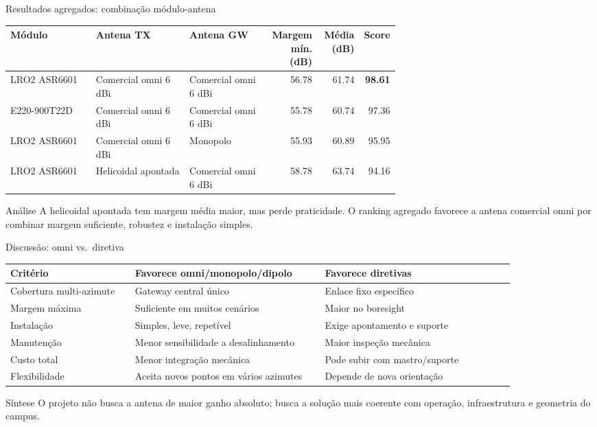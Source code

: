\documentclass[aspectratio=169]{beamer}
\begin{document}
\begin{frame}{Resultados agregados: combinação módulo-antena}
\small
\scriptsize
\begin{tabular}{p{0.22\linewidth}p{0.24\linewidth}p{0.20\linewidth}rrr}
\toprule
Módulo & Antena TX & Antena GW & Margem mín. (dB) & Média (dB) & Score \\
\midrule
LRO2 ASR6601  & Comercial omni 6 dBi  & Comercial omni 6 dBi & 56.78 & 61.74 & \textbf{98.61} \\
E220-900T22D  & Comercial omni 6 dBi  & Comercial omni 6 dBi & 55.78 & 60.74 & 97.36 \\
LRO2 ASR6601  & Comercial omni 6 dBi  & Monopolo             & 55.93 & 60.89 & 95.95 \\
LRO2 ASR6601  & Helicoidal apontada   & Comercial omni 6 dBi & 58.78 & 63.74 & 94.16 \\
\bottomrule
\end{tabular}
\vspace{0.5em}
\begin{block}{Análise}
A helicoidal apontada tem margem média maior, mas perde praticidade. O ranking agregado favorece a antena comercial omni por combinar margem suficiente, robustez e instalação simples.
\end{block}
\end{frame}
\begin{frame}{Discussão: omni vs.\ diretiva}
\small
\scriptsize
\begin{tabular}{p{0.23\linewidth}p{0.35\linewidth}p{0.35\linewidth}}
\toprule
Critério & Favorece omni/monopolo/dipolo & Favorece diretivas \\
\midrule
Cobertura multi-azimute & Gateway central único & Enlace fixo específico \\
Margem máxima & Suficiente em muitos cenários & Maior no boresight \\
Instalação & Simples, leve, repetível & Exige apontamento e suporte \\
Manutenção & Menor sensibilidade a desalinhamento & Maior inspeção mecânica \\
Custo total & Menor integração mecânica & Pode subir com mastro/suporte \\
Flexibilidade & Aceita novos pontos em vários azimutes & Depende de nova orientação \\
\bottomrule
\end{tabular}
\vspace{0.5em}
\begin{block}{Síntese}
\small O projeto não busca a antena de maior ganho absoluto; busca a solução mais coerente com operação, infraestrutura e geometria do campus.
\end{block}
\end{frame}
\end{document}
